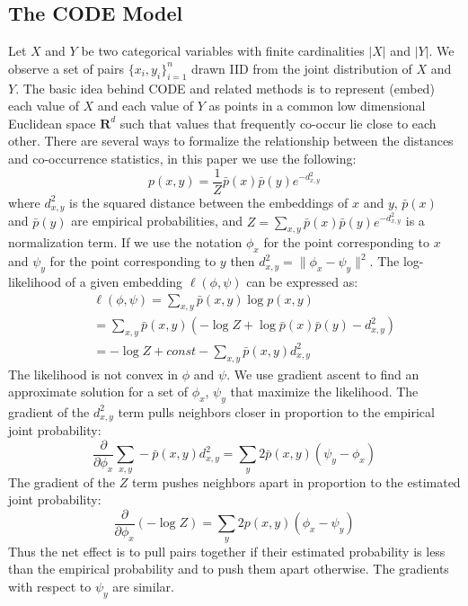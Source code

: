 \subsection{The CODE Model}
\label{sec:codethr}

Let $X$ and $Y$ be two categorical variables with finite cardinalities
$|X|$ and $|Y|$.  We observe a set of pairs $\{x_i, y_i\}_{i=1}^n$
drawn IID from the joint distribution of $X$ and $Y$.  The basic idea
behind CODE and related methods is to represent (embed) each value of
$X$ and each value of $Y$ as points in a common low dimensional
Euclidean space $\mathbf{R}^d$ such that values that frequently
co-occur lie close to each other.  There are several ways to formalize
the relationship between the distances and co-occurrence statistics, in
this paper we use the following:
\begin{equation} \label{eq:probability}
p(x,y) = \frac{1}{Z} \bar{p}(x) \bar{p}(y) e^{-d^2_{x,y}}
\end{equation}
\noindent where $d^2_{x,y}$ is the squared distance between the
embeddings of $x$ and $y$, $\bar{p}(x)$ and $\bar{p}(y)$ are empirical
probabilities, and $Z=\sum_{x,y} \bar{p}(x) \bar{p}(y) e^{-d^2_{x,y}}$ is
a normalization term.  If we use the notation $\phi_x$ for the
point corresponding to $x$ and $\psi_y$ for the point corresponding
to $y$ then $d^2_{x,y} = \|\phi_x-\psi_y\|^2$.  The log-likelihood
of a given embedding $\ell(\phi, \psi)$ can be expressed as:
\begin{eqnarray} 
&&\ell(\phi, \psi) = \sum_{x,y} \bar{p}(x,y) \log p(x,y) \label{eq:likelihood} \\
&&= \sum_{x,y} \bar{p}(x,y) (-\log Z + \log \bar{p}(x)\bar{p}(y) - d^2_{x,y}) \nonumber \\
&&= -\log Z + \mathit{const} - \sum_{x,y} \bar{p}(x,y) d^2_{x,y} \nonumber
\end{eqnarray}
The likelihood is not convex in $\phi$ and $\psi$.  We use gradient
ascent to find an approximate solution for a set of $\phi_x$, $\psi_y$
that maximize the likelihood.  The gradient of the $d^2_{x,y}$ term
pulls neighbors closer in proportion to the empirical joint
probability:
\begin{equation}
\frac{\partial}{\partial\phi_x} \sum_{x,y} -\bar{p}(x,y) d^2_{x,y} =
\sum_y 2 \bar{p}(x,y) (\psi_y - \phi_x) \label{eq:attract}
\end{equation}
The gradient of the $Z$ term pushes neighbors apart in proportion to the
estimated joint probability:
\begin{equation}
\frac{\partial}{\partial\phi_x} (-\log Z) = \sum_y 2 p(x,y) (\phi_x -
\psi_y) \label{eq:repulse}
\end{equation}
Thus the net effect is to pull pairs together if their estimated
probability is less than the empirical probability and to push them
apart otherwise.  The gradients with respect to $\psi_y$ are
similar.

